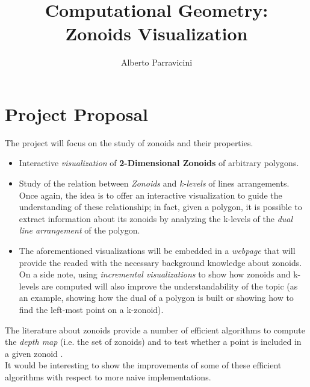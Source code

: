 \documentclass[
12pt,
a4paper,
oneside,
headinclude,
footinclude]{article}
\title{\textbf{Computational Geometry: \\ Zonoids Visualization}}
\author{{Alberto Parravicini}}
\date{}	%
\begin{document}
\maketitle
{}

\section{Project Proposal}
The project will focus on the study of zonoids and their properties. 
\begin{itemize}
	\item Interactive \textit{visualization} of \textbf{2-Dimensional Zonoids} of arbitrary polygons.
	\item Study of the relation between \textit{Zonoids} and \textit{k-levels} of lines arrangements.\\
	Once again, the idea is to offer an interactive visualization to guide the understanding of these relationship; in fact, given a polygon, it is possible to extract information about its zonoids by analyzing the k-levels of the \textit{dual line arrangement} of the polygon.
	\item The aforementioned visualizations will be embedded in a \textit{webpage} that will provide the readed with the necessary background knowledge about zonoids. \\
	On a side note, using \textit{incremental visualizations} to show how zonoids and k-levels are computed will also improve the understandability of the topic (as an example, showing how the dual of a polygon is built or showing how to find the left-most point on a k-zonoid).
\end{itemize}
The literature about zonoids provide a number of efficient algorithms to compute the \textit{depth map} (i.e. the set of zonoids) \cite{GOPALA20082} and to test whether a point is included in a given zonoid \cite{MORIN2008229}. \\It would be interesting to show the improvements of some of these efficient algorithms with respect to more naive implementations.




\end{document}

